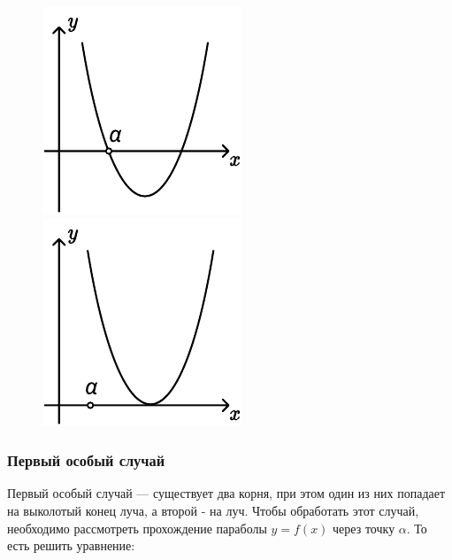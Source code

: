 \begin {figure}[h]
    \begin {minipage} [t] {0.5\linewidth}
        \centering
        \includegraphics [width=0.6\linewidth] {image/image_12.pdf}
    \end {minipage}
    \begin {minipage} [t] {0.5\linewidth}
        \centering
        \includegraphics [width=0.6\linewidth] {image/image_14.pdf}
    \end {minipage}
\end {figure}

\subsubsection {Первый особый случай}

Первый особый случай --- существует два корня, при этом один из них попадает на выколотый конец
луча, а второй - на луч. Чтобы обработать этот случай, необходимо рассмотреть прохождение параболы
$y = f(x)$ через точку $\alpha$. То есть решить уравнение:

